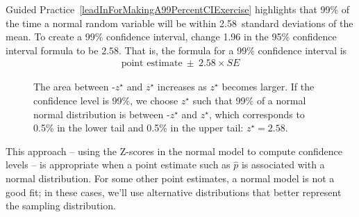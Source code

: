 Guided Practice~\ref{leadInForMakingA99PercentCIExercise} highlights
that 99\% of the time a normal random variable will be within
2.58~standard deviations of the mean.
To create a 99\% confidence interval, change 1.96 in the 95\%
confidence interval formula to be $2.58$.
That is, the formula
for a 99\% confidence interval is
\begin{align*}
\text{point estimate}\ \pm\ 2.58 \times SE
\end{align*}

\begin{figure}[h]
  \centering
  \caption{The area between -$z^{\star}$ and $z^{\star}$ increases as
      $z^{\star}$ becomes larger. If the confidence level is 99\%,
      we choose $z^{\star}$ such that 99\% of a normal
      normal distribution is between -$z^{\star}$ and $z^{\star}$,
      which corresponds to 0.5\%
      in the lower tail and 0.5\% in the upper tail:
      $z^{\star}=2.58$.}
\label{choosingZForCI}
\end{figure}

\D{\newpage}

This approach -- using the Z-scores in the
normal model to compute confidence levels --
is appropriate when a point estimate such as $\hat{p}$
is associated with a normal distribution.
For some other point estimates, a normal model is not a good fit;
in these cases, we'll use alternative distributions that better
represent the sampling distribution.

